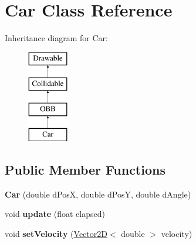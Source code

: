 \hypertarget{class_car}{}\section{Car Class Reference}
\label{class_car}
Inheritance diagram for Car\+:\begin{figure}[H]
\begin{center}
\leavevmode
\includegraphics[height=4.000000cm]{class_car}
\end{center}
\end{figure}
\subsection*{Public Member Functions}
\begin{DoxyCompactItemize}
\item 
\hypertarget{class_car_a50aa52b3551e1d832bfaa832abe2ca05}{}{\bfseries Car} (double d\+Pos\+X, double d\+Pos\+Y, double d\+Angle)\label{class_car_a50aa52b3551e1d832bfaa832abe2ca05}

\item 
\hypertarget{class_car_ab7860fcfd5e75787d358128e04442464}{}void {\bfseries update} (float elapsed)\label{class_car_ab7860fcfd5e75787d358128e04442464}

\item 
\hypertarget{class_car_ac5fffcaa49fe357439427c37cb146c26}{}void {\bfseries set\+Velocity} (\hyperlink{class_vector2_d}{Vector2\+D}$<$ double $>$ velocity)\label{class_car_ac5fffcaa49fe357439427c37cb146c26}

\end{DoxyCompactItemize}
